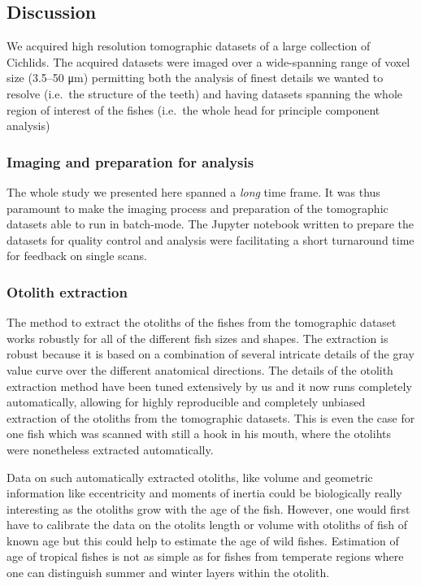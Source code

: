 \hypertarget{discussion}{%
\subsection{Discussion}\label{discussion}}

We acquired high resolution tomographic datasets of a large collection of Cichlids.
The acquired datasets were imaged over a wide-spanning range of voxel size (3.5--50 μm) permitting both the analysis of finest details we wanted to resolve (i.e.~the structure of the teeth) and having datasets spanning the whole region of interest of the fishes (i.e.~the whole head for principle component analysis)

\hypertarget{imaging-and-preparation-for-analysis}{%
\subsubsection{Imaging and preparation for analysis}\label{imaging-and-preparation-for-analysis}}

The whole study we presented here spanned a \emph{long} time frame.
It was thus paramount to make the imaging process and preparation of the tomographic datasets able to run in batch-mode.
The Jupyter notebook written to prepare the datasets for quality control and analysis were facilitating a short turnaround time for feedback on single scans.

\hypertarget{otolith-extraction}{%
\subsubsection{Otolith extraction}\label{otolith-extraction}}

The method to extract the otoliths of the fishes from the tomographic dataset works robustly for all of the different fish sizes and shapes.
The extraction is robust because it is based on a combination of several intricate details of the gray value curve over the different anatomical directions.
The details of the otolith extraction method have been tuned extensively by us and it now runs completely automatically, allowing for highly reproducible and completely unbiased extraction of the otoliths from the tomographic datasets.
This is even the case for one fish which was scanned with still a hook in his mouth, where the otolihts were nonetheless extracted automatically.

Data on such automatically extracted otoliths, like volume and geometric information like eccentricity and moments of inertia could be biologically really interesting as the otoliths grow with the age of the fish.
However, one would first have to calibrate the data on the otolits length or volume with otoliths of fish of known age but this could help to estimate the age of wild fishes.
Estimation of age of tropical fishes is not as simple as for fishes from temperate regions where one can distinguish summer and winter layers within the otolith.

